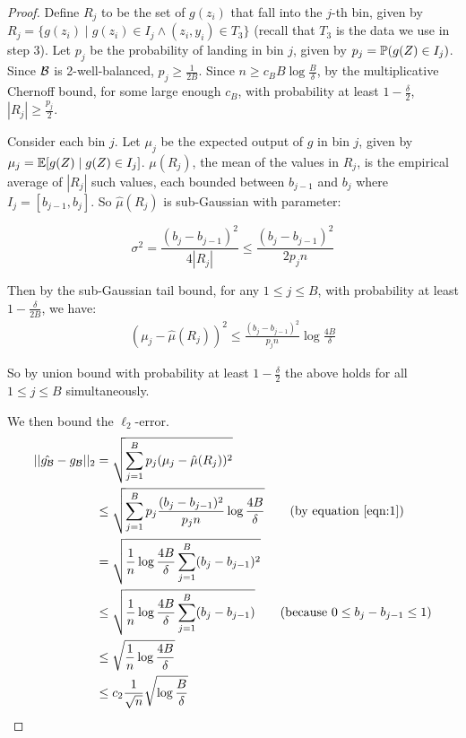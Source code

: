 \begin{proof}
Define $R_j$ to be the set of $g(z_i)$ that fall into the $j$-th bin, given by $R_j = \{g(z_i) \mid g(z_i) \in I_j \wedge (z_i, y_i) \in T_3\}$ (recall that $T_3$ is the data we use in step 3).
Let $p_j$ be the probability of landing in bin $j$, given by $p_j = \mathbb{P}(g(Z) \in I_j)$.
Since $\mathcal{B}{}$ is 2-well-balanced, $p_j \geq \frac{1}{2B}$.
Since $n \geq c_B B\log{\frac{B}{\delta}}$, by the multiplicative Chernoff bound, for some large enough $c_B$, with probability at least $1 - \frac{\delta}{2}$, $|R_j| \geq \frac{p_j}{2}$.

Consider each bin $j$. Let $\mu_j$ be the expected output of $g$ in bin $j$, given by $\mu_j = \mathbb{E}[g(Z) \; | \; g(Z) \in I_j]$. $\mu(R_j)$, the mean of the values in $R_j$, is the empirical average of $|R_j|$ such values, each bounded between $b_{j-1}$ and $b_j$ where $I_j = [b_{j-1}, b_j]$. So $\hat{\mu}(R_j)$ is sub-Gaussian with parameter:

\[ \sigma^2 = \frac{(b_j - b_{j-1})^2}{4|R_j|} \leq \frac{(b_j - b_{j-1})^2}{2p_jn} \]

Then by the sub-Gaussian tail bound, for any $1 \leq j \leq B$, with probability at least $1 - \frac{\delta}{2B}$, we have:
\begin{align} (\mu_j - \hat{\mu}(R_j))^2 \leq \frac{(b_j - b_{j-1})^2}{p_jn} \log{\frac{4B}{\delta}}\label{eqn:1} \end{align}

So by union bound with probability at least $1 - \frac{\delta}{2}$ the above holds for all $1 \leq j \leq B$ simultaneously.

We then bound the $\ell_2$-error.
\begin{align*}
||\hat{g_{\mathcal{B}}} - g_{\mathcal{B}}||_2 &= \sqrt{\sum_{j =1}^B p_j (\mu_j - \hat{\mu}(R_j))^2} \\
&\leq \sqrt{\sum_{j =1}^B p_j \frac{(b_j - b_{j-1})^2}{p_jn} \log{\frac{4B}{\delta}}} \tag{by equation~\eqref{eqn:1}}\\
&= \sqrt{\frac{1}{n} \log{\frac{4B}{\delta}} \sum_{j =1}^B (b_j - b_{j-1})^2 } \\
&\leq \sqrt{\frac{1}{n} \log{\frac{4B}{\delta}} \sum_{j =1}^B (b_j - b_{j-1}) } \tag{because $0\le b_j - b_{j-1}\le 1$}\\
&\leq \sqrt{\frac{1}{n} \log{\frac{4B}{\delta}} } \\
&\leq c_2 \frac{1}{\sqrt{n}} \sqrt{\log{\frac{B}{\delta}}}
\end{align*}


\end{proof}
